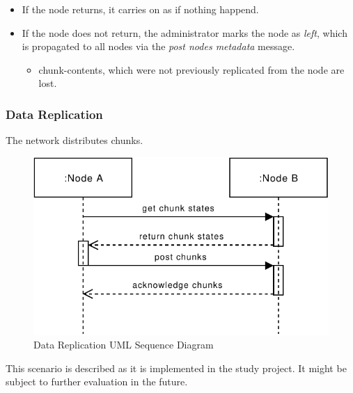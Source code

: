 \begin{itemize}
    \item If the \gls{node} returns, it carries on as if nothing happend.
    \item If the \gls{node} does not return, the \gls{administrator} marks the \gls{node} as \emph{left}, which is propagated to all \glspl{node} via the \emph{post nodes metadata} message.
        \begin{itemize}
            \item \glspl{chunk-content}, which were not previously replicated from the \gls{node} are lost.
        \end{itemize}
\end{itemize}

\subsubsection{Data Replication}\label{sec:scenario-data-replication}
The network distributes \glspl{chunk}.

\begin{figure}[h]
    \centering
    \includegraphics[width=0.6\linewidth]{resources/data_replication.pdf}
    \caption{Data Replication UML Sequence Diagram}
    \label{fig:data-replication}
\end{figure}

This scenario is described as it is implemented in the study project. It might be subject to further evaluation in the future.

